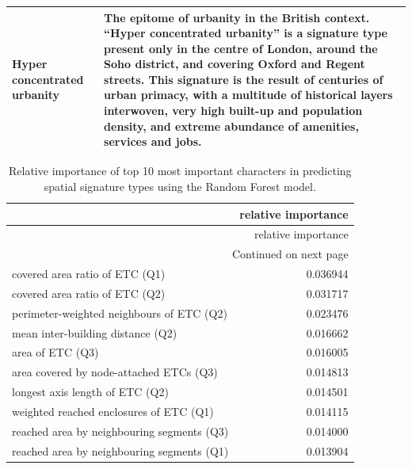 \documentclass[fleqn,10pt]{wlscirep}
\begin{document}
\begin{longtable}{p{}p{}}
    Hyper concentrated urbanity          &     The epitome of urbanity in the British context. “Hyper concentrated urbanity” is a signature type present only in the centre of London, around the Soho district, and covering Oxford and Regent streets. This signature is the result of centuries of urban primacy, with a multitude of historical layers interwoven, very high built-up and population density, and extreme abundance of amenities, services and jobs. \\
    \bottomrule
\end{longtable}
\begin{longtable}{lr}
    \caption{\label{tab:imp}Relative importance of top 10 most important characters in
predicting spatial signature types using the Random Forest model.}\\
    \toprule
    {} &  relative importance \\
    \midrule
    \endfirsthead
    \toprule
    {} &  relative importance \\
    \midrule
    \endhead
    \midrule
    \multicolumn{2}{r}{{Continued on next page}} \\
    \midrule
    \endfoot
    \bottomrule
    \endlastfoot
    covered area ratio of ETC (Q1)             &             0.036944 \\
    covered area ratio of ETC (Q2)             &             0.031717 \\
    perimeter-weighted neighbours of ETC (Q2)  &             0.023476 \\
    mean inter-building distance (Q2)          &             0.016662 \\
    area of ETC (Q3)                           &             0.016005 \\
    area covered by node-attached ETCs (Q3)    &             0.014813 \\
    longest axis length of ETC (Q2)            &             0.014501 \\
    weighted reached enclosures of ETC (Q1)    &             0.014115 \\
    reached area by neighbouring segments (Q3) &             0.014000 \\
    reached area by neighbouring segments (Q1) &             0.013904 \\
\end{longtable}
\tiny
\end{document}
